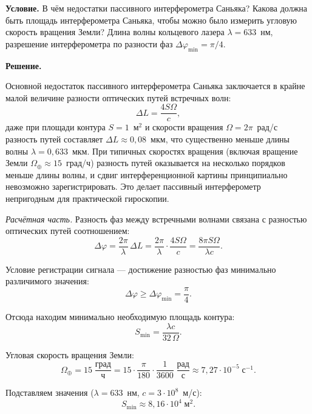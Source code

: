 \documentclass[12pt, a4paper]{article}
\begin{document}
\textbf{Условие.} В чём недостатки пассивного интерферометра Саньяка? Какова должна быть площадь интерферометра Саньяка, чтобы можно было измерить угловую скорость вращения Земли? Длина волны кольцевого лазера $\lambda = 633$~нм, разрешение интерферометра по разности фаз $\Delta\varphi_{\min} = \pi/4$.

\textbf{Решение.}

Основной недостаток пассивного интерферометра Саньяка заключается в крайне малой величине разности оптических путей встречных волн:
\begin{equation}
    \Delta L = \frac{4S\Omega}{c},
\end{equation}
даже при площади контура $S = 1$~м$^2$ и скорости вращения $\Omega = 2\pi$~рад/с разность путей составляет $\Delta L \approx 0{,}08$~мкм, что существенно меньше длины волны $\lambda = 0{,}633$~мкм. При типичных скоростях вращения (включая вращение Земли $\Omega_\oplus \approx 15$~град/ч) разность путей оказывается на несколько порядков меньше длины волны, и сдвиг интерференционной картины принципиально невозможно зарегистрировать. Это делает пассивный интерферометр непригодным для практической гироскопии.

\textit{Расчётная часть.} Разность фаз между встречными волнами связана с разностью оптических путей соотношением:
\begin{equation}
    \Delta\varphi = \frac{2\pi}{\lambda}\,\Delta L = \frac{2\pi}{\lambda}\cdot\frac{4S\Omega}{c} = \frac{8\pi S\Omega}{\lambda c}.
\end{equation}

Условие регистрации сигнала --- достижение разностью фаз минимально различимого значения:
\begin{equation}
    \Delta\varphi \geqslant \Delta\varphi_{\min} = \frac{\pi}{4}.
\end{equation}

Отсюда находим минимально необходимую площадь контура:
\begin{equation}
    S_{\min} = \frac{\lambda c}{32\,\Omega}.
\end{equation}

Угловая скорость вращения Земли:
\begin{equation}
    \Omega_\oplus = 15\;\frac{\text{град}}{\text{ч}} = 15\cdot\frac{\pi}{180}\cdot\frac{1}{3600}\;\frac{\text{рад}}{\text{с}} \approx 7{,}27\cdot 10^{-5}\;\text{с}^{-1}.
\end{equation}

Подставляем значения ($\lambda = 633$~нм, $c = 3\cdot 10^{8}$~м/с):
\begin{equation}
    S_{\min} \approx 8{,}16\cdot 10^{4}\;\text{м}^2.
\end{equation}
\end{document}
